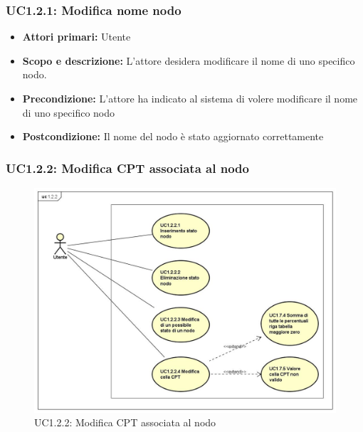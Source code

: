 \subsubsection{UC1.2.1: Modifica nome nodo} 
\begin{itemize} 
	\item{\textbf{Attori primari:} Utente} 
	\item{\textbf{Scopo e descrizione:} L'attore desidera modificare il nome di uno specifico nodo.} 
	\item{\textbf{Precondizione:} L'attore ha indicato al sistema di volere modificare il nome di uno specifico nodo} 
	\item{\textbf{Postcondizione:} Il nome del nodo è stato aggiornato correttamente} 
\end{itemize} 
\subsubsection{UC1.2.2: Modifica CPT associata al nodo} 
\begin{figure} [H]
	\centering
	\includegraphics[scale=0.45]{Img/UC1-2-2} 
	\caption{UC1.2.2: Modifica CPT associata al nodo} \label{} 
\end{figure} 

